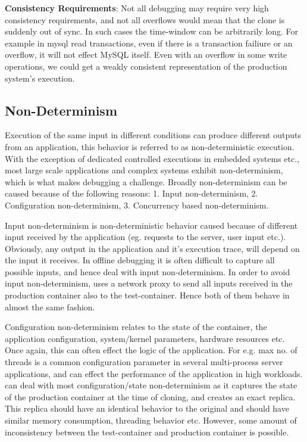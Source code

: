 
\textbf{Consistency Requirements}: Not all debugging may require very high consistency requirements, and not all overflows would mean that the clone is suddenly out of sync.
In such cases the time-window can be arbitrarily long. 
For example in mysql read transactions, even if there is a transaction failiure or an overflow, it will not effect MySQL itself.
Even with an overflow in some write operations, we could get a weakly consistent representation of the production system's execution.


\iffalse
\subsection{Non-Determinism}
\label{sec:nonDeterminism}

Execution of the same input in different conditions can produce different outputs from an application, this behavior is referred to as non-deterministic execution.
With the exception of dedicated controlled executions in embedded systems etc., most large scale applications and complex systems exhibit non-determinism, which is what makes debugging a challenge.
Broadly non-determinism can be caused because of the following reasons: 1. Input non-determinism, 2. Configuration non-determinism, 3. Concurrency based non-determinism.

Input non-determinism is non-deterministic behavior caused because of different input received by the application (eg. requests to the server, user input etc.). 
Obviously, any output in the application and it's execution trace, will depend on the input it receives. 
In offline debugging it is often difficult to capture all possible inputs, and hence deal with input non-determinism.
In order to avoid input non-determinism, \parikshan uses a network proxy to send all inputs received in the production container also to the test-container. 
Hence both of them behave in almost the same fashion.

Configuration non-determinism relates to the state of the container, the application configuration, system/kernel parameters, hardware resources etc.
Once again, this can often effect the logic of the application.
For e.g. max no. of threads is a common configuration parameter in several multi-process server applications, and can effect the performance of the application in high workloads.
\parikshan can deal with most configuration/state non-determinism as it captures the state of the production container at the time of cloning, and creates an exact replica.
This replica should have an identical behavior to the original and should have similar memory consumption, threading behavior etc. 
However, some amount of inconsistency between the test-container and production container is possible.

